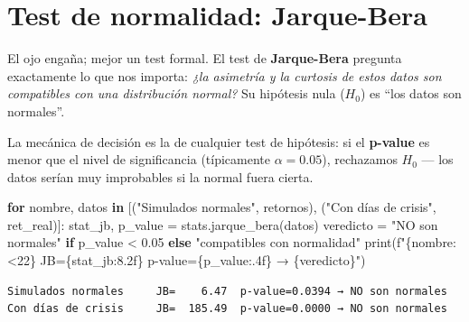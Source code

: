 \documentclass[
  spanish,
  letterpaper,
  DIV=11,
  numbers=noendperiod]{scrreprt}
\newenvironment{Shaded}{\begin{snugshade}}{\end{snugshade}}
\newcommand{\BuiltInTok}[1]{\textcolor[rgb]{0.00,0.23,0.31}{#1}}
\newcommand{\ControlFlowTok}[1]{\textcolor[rgb]{0.00,0.23,0.31}{\textbf{#1}}}
\newcommand{\FloatTok}[1]{\textcolor[rgb]{0.68,0.00,0.00}{#1}}
\newcommand{\KeywordTok}[1]{\textcolor[rgb]{0.00,0.23,0.31}{\textbf{#1}}}
\newcommand{\NormalTok}[1]{\textcolor[rgb]{0.00,0.23,0.31}{#1}}
\newcommand{\OperatorTok}[1]{\textcolor[rgb]{0.37,0.37,0.37}{#1}}
\newcommand{\SpecialCharTok}[1]{\textcolor[rgb]{0.37,0.37,0.37}{#1}}
\newcommand{\SpecialStringTok}[1]{\textcolor[rgb]{0.13,0.47,0.30}{#1}}
\newcommand{\StringTok}[1]{\textcolor[rgb]{0.13,0.47,0.30}{#1}}
\begin{document}
\section{Test de normalidad:
Jarque-Bera}\label{test-de-normalidad-jarque-bera}

El ojo engaña; mejor un test formal. El test de \textbf{Jarque-Bera}
pregunta exactamente lo que nos importa: \emph{¿la asimetría y la
curtosis de estos datos son compatibles con una distribución normal?} Su
hipótesis nula (\(H_0\)) es ``los datos son normales''.

La mecánica de decisión es la de cualquier test de hipótesis: si el
\textbf{p-value} es menor que el nivel de significancia (típicamente
\(\alpha = 0.05\)), rechazamos \(H_0\) --- los datos serían muy
improbables si la normal fuera cierta.

\label{jarque-bera}
\begin{Shaded}
\begin{Highlighting}[]
\ControlFlowTok{for}\NormalTok{ nombre, datos }\KeywordTok{in}\NormalTok{ [(}\StringTok{"Simulados normales"}\NormalTok{, retornos),}
\NormalTok{                      (}\StringTok{"Con días de crisis"}\NormalTok{, ret\_real)]:}
\NormalTok{    stat\_jb, p\_value }\OperatorTok{=}\NormalTok{ stats.jarque\_bera(datos)}
\NormalTok{    veredicto }\OperatorTok{=} \StringTok{"NO son normales"} \ControlFlowTok{if}\NormalTok{ p\_value }\OperatorTok{\textless{}} \FloatTok{0.05} \ControlFlowTok{else} \StringTok{"compatibles con normalidad"}
    \BuiltInTok{print}\NormalTok{(}\SpecialStringTok{f"}\SpecialCharTok{\{}\NormalTok{nombre}\SpecialCharTok{:\textless{}22\}}\SpecialStringTok{ JB=}\SpecialCharTok{\{}\NormalTok{stat\_jb}\SpecialCharTok{:8.2f\}}\SpecialStringTok{  p{-}value=}\SpecialCharTok{\{}\NormalTok{p\_value}\SpecialCharTok{:.4f\}}\SpecialStringTok{ → }\SpecialCharTok{\{}\NormalTok{veredicto}\SpecialCharTok{\}}\SpecialStringTok{"}\NormalTok{)}
\end{Highlighting}
\end{Shaded}

\begin{verbatim}
Simulados normales     JB=    6.47  p-value=0.0394 → NO son normales
Con días de crisis     JB=  185.49  p-value=0.0000 → NO son normales
\end{verbatim}
\end{document}
